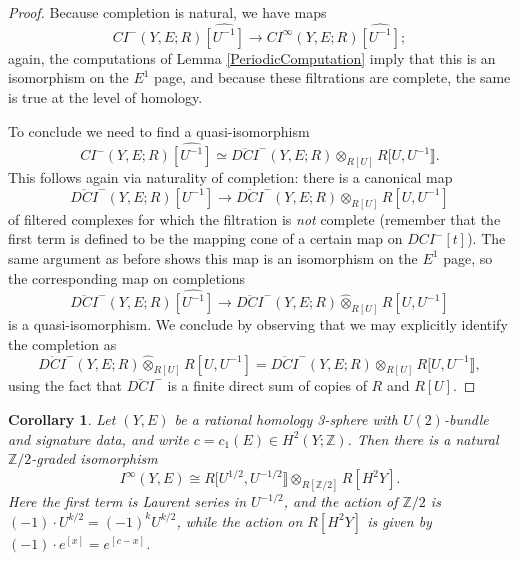 \documentclass{memo-l}
\newtheorem{corollary}[theorem]{Corollary}
\theoremstyle{definition}
\theoremstyle{remark}
\numberwithin{section}{chapter}
\numberwithin{equation}{chapter}
\begin{document}
\begin{proof}
Because completion is natural, we have maps $$CI^-(Y,E;R)\widehat{[U^{-1}]} \to CI^\infty(Y,E;R)\widehat{[U^{-1}]};$$ again, the computations of Lemma \ref{PeriodicComputation} imply that this is an isomorphism on the $E^1$ page, and because these filtrations are complete, the same is true at the level of homology.

To conclude we need to find a quasi-isomorphism 
$$CI^-(Y,E;R)\widehat{[U^{-1}]} \simeq \overline{DCI}^-(Y,E;R) \otimes_{R[U]} R[U, U^{-1}\rrbracket.$$ 
This follows again via naturality of completion: there is a canonical map $$\overline{DCI}^-(Y,E;R)[U^{-1}] \to \overline{DCI}^-(Y,E;R) \otimes_{R[U]} R[U, U^{-1}]$$ of filtered complexes for which the filtration is \textit{not} complete (remember that the first term is defined to be the mapping cone of a certain map on $DCI^-[t]$). The same argument as before shows this map is an isomorphism on the $E^1$ page, so the corresponding map on completions 
$$\overline{DCI}^-(Y,E;R)\widehat{[U^{-1}]} \to \overline{DCI}^-(Y,E;R) \widehat{\otimes}_{R[U]} R[U, U^{-1}]$$ is a quasi-isomorphism. We conclude by observing that we may explicitly identify the completion as $$\overline{DCI}^-(Y,E;R) \widehat{\otimes}_{R[U]} R[U, U^{-1}] = \overline{DCI}^-(Y,E;R) \otimes_{R[U]} R[U, U^{-1}\rrbracket,$$ using the fact that $\overline{DCI}^-$ is a finite direct sum of copies of $R$ and $R[U]$.
\end{proof}

\begin{corollary}\label{tate-iso}Let $(Y,E)$ be a rational homology 3-sphere with $U(2)$-bundle and signature data, and write $c = c_1(E) \in H^2(Y;\mathbb Z)$. Then there is a natural $\mathbb Z/2$-graded isomorphism $$I^\infty(Y,E) \cong R[U^{1/2}, U^{-1/2}\rrbracket \otimes_{R[\mathbb Z/2]} R[H^2 Y].$$ Here the first term is Laurent series in $U^{-1/2}$, and the action of $\mathbb Z/2$ is $(-1) \cdot U^{k/2} = (-1)^k U^{k/2}$, while the action on $R[H^2 Y]$ is given by $(-1) \cdot e^{[x]} = e^{[c - x]}$.
\end{corollary}
\end{document}
